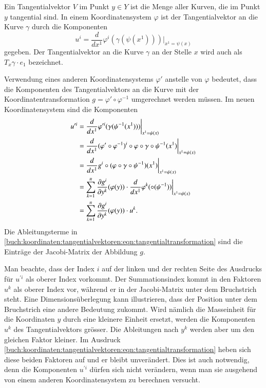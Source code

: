 \begin{definition}[Tangentialvektor]
\label{buch:koordinaten:tangentialvektoren:def:tangentialvektor}
%
Ein Tangentialvektor $V$ im Punkt $y\in Y$ ist die Menge aller Kurven, die
im Punkt $y$ tangential sind.
In einem Koordinatensystem $\varphi$ ist der Tangentialvektor an die Kurve
$\gamma$ durch die Komponenten
\[
u^i
=
\frac{d}{dx^1} \varphi^i(\gamma(\psi(x^1))) \bigg|_{x^1 = \psi(x)}
\]
gegeben.
Der Tangentialvektor an die Kurve $\gamma$ an der Stelle $x$
wird auch als $T_x\gamma\cdot e_1$ bezeichnet.
\end{definition}

Verwendung eines anderen Koordinatensystems $\varphi'$ anstelle von
$\varphi$ bedeutet, dass die Komponenten des Tangentialvektors
an die Kurve mit der Koordinatentransformation
$g=\varphi'\circ\varphi^{-1}$ umgerechnet werden müssen.
Im neuen Koordinatensystem sind die Komponenten
\begin{align}
u^{\prime i}
&=
\frac{d}{dx^1}
\varphi^{\prime i}(\gamma(\psi^{-1}(x^1))) \bigg|_{x^1=\psi(x)}
\notag
\\
&=
\frac{d}{dx^1}
(\varphi'\circ\varphi^{-1})^i\circ \varphi\circ\gamma\circ\psi^{-1}(x^1)
\bigg|_{x^1=\psi(x)}
\notag
\\
&=
\frac{d}{dx^1} g^i\circ(\varphi\circ\gamma\circ\psi^{-1})(x^1)
\bigg|_{x^1=\psi(x)}
\notag
\\
&=
\sum_{k=1}^n
\frac{\partial g^i}{\partial y^k}(\varphi(y))
\cdot
\frac{d}{dx^1}\varphi^k(\circ(\psi^{-1})) 
\bigg|_{x^1=\psi(x)}
\notag
\\
&=
\sum_{k=1}^n
\frac{\partial g^i}{\partial y^k}(\varphi(y))
\cdot
u^k.
\label{buch:koordinaten:tangentialvektoren:eqn:tangentialtransformation}
\end{align}
Die Ableitungsterme in
\eqref{buch:koordinaten:tangentialvektoren:eqn:tangentialtransformation}
sind die Einträge der Jacobi-Matrix der Abbildung $g$.
%

Man beachte, dass der Index $i$ auf der linken und der rechten 
Seite des Ausdrucks für $u^{\prime i}$ als oberer Index vorkommt.
Der Summationsindex kommt in den Faktoren $u^k$ als oberer Index
vor, während er in der Jacobi-Matrix unter dem Bruchstrich steht.
Eine Dimensionsüberlegung kann illustrieren, dass der Position unter
dem Bruchstrich eine andere Bedeutung zukommt.
Wird nämlich die Masseinheit für die Koordinaten $y$ durch eine kleinere
Einheit ersetzt, werden die Komponenten $u^k$ des Tangentialvektors
grösser.
Die Ableitungen nach $y^k$ werden aber um den gleichen Faktor kleiner.
Im Ausdruck 
\eqref{buch:koordinaten:tangentialvektoren:eqn:tangentialtransformation}
heben sich diese beiden Faktoren auf und er bleibt unverändert.
Dies ist auch notwendig, denn die Komponenten $u^{\prime i}$ dürfen
sich nicht verändern, wenn man sie ausgehend von einem anderen
Koordinatensystem zu berechnen versucht.

